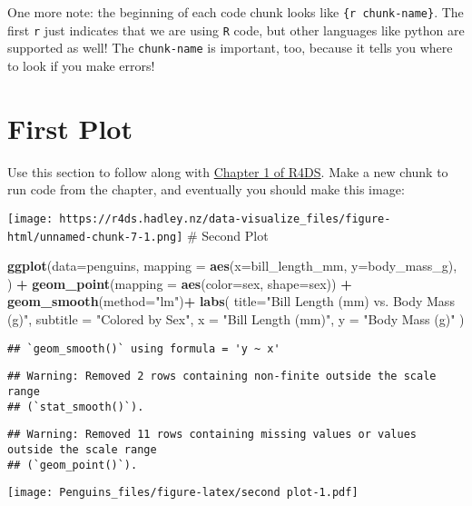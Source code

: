 \documentclass[
]{article}
\newenvironment{Shaded}{\begin{snugshade}}{\end{snugshade}}
\newcommand{\AttributeTok}[1]{\textcolor[rgb]{0.13,0.29,0.53}{#1}}
\newcommand{\FunctionTok}[1]{\textcolor[rgb]{0.13,0.29,0.53}{\textbf{#1}}}
\newcommand{\NormalTok}[1]{#1}
\newcommand{\SpecialCharTok}[1]{\textcolor[rgb]{0.81,0.36,0.00}{\textbf{#1}}}
\newcommand{\StringTok}[1]{\textcolor[rgb]{0.31,0.60,0.02}{#1}}
\begin{document}
One more note: the beginning of each code chunk looks like
\texttt{\{r\ chunk-name\}}. The first \texttt{r} just indicates that we
are using \texttt{R} code, but other languages like python are supported
as well! The \texttt{chunk-name} is important, too, because it tells you
where to look if you make errors!

\section{First Plot}\label{first-plot}

Use this section to follow along with
\href{https://r4ds.hadley.nz/data-visualize}{Chapter 1 of R4DS}. Make a
new chunk to run code from the chapter, and eventually you should make
this image:

\texttt{[image: https://r4ds.hadley.nz/data-visualize\_files/figure-html/unnamed-chunk-7-1.png]}
\# Second Plot

\begin{Shaded}
\begin{Highlighting}[]
\FunctionTok{ggplot}\NormalTok{(}\AttributeTok{data=}\NormalTok{penguins,}
       \AttributeTok{mapping =} \FunctionTok{aes}\NormalTok{(}\AttributeTok{x=}\NormalTok{bill\_length\_mm, }\AttributeTok{y=}\NormalTok{body\_mass\_g),}
\NormalTok{       ) }\SpecialCharTok{+}
  \FunctionTok{geom\_point}\NormalTok{(}\AttributeTok{mapping =} \FunctionTok{aes}\NormalTok{(}\AttributeTok{color=}\NormalTok{sex, }\AttributeTok{shape=}\NormalTok{sex)) }\SpecialCharTok{+}
  \FunctionTok{geom\_smooth}\NormalTok{(}\AttributeTok{method=}\StringTok{"lm"}\NormalTok{)}\SpecialCharTok{+}
  \FunctionTok{labs}\NormalTok{(}
    \AttributeTok{title=}\StringTok{"Bill Length (mm) vs. Body Mass (g)"}\NormalTok{,}
    \AttributeTok{subtitle =} \StringTok{"Colored by Sex"}\NormalTok{,}
    \AttributeTok{x =} \StringTok{"Bill Length (mm)"}\NormalTok{, }\AttributeTok{y =} \StringTok{"Body Mass (g)"}
\NormalTok{  )}
\end{Highlighting}
\end{Shaded}

\begin{verbatim}
## `geom_smooth()` using formula = 'y ~ x'
\end{verbatim}

\begin{verbatim}
## Warning: Removed 2 rows containing non-finite outside the scale range
## (`stat_smooth()`).
\end{verbatim}

\begin{verbatim}
## Warning: Removed 11 rows containing missing values or values outside the scale range
## (`geom_point()`).
\end{verbatim}

\texttt{[image: Penguins\_files/figure-latex/second plot-1.pdf]}
\end{document}
